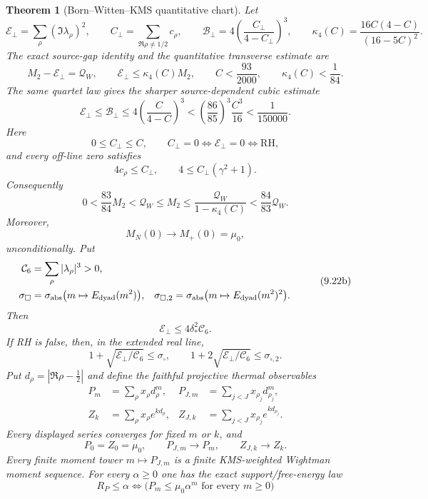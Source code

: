 \documentclass[11pt]{article}
\newtheorem{theorem}{Theorem}[section]
\begin{document}
\begin{theorem}[Born--Witten--KMS quantitative chart]
Let
\[
 \mathcal E_\perp=\sum_\rho(\Im\lambda_\rho)^2,\qquad
 C_\perp=\sum_{\Re\rho\ne1/2}c_\rho,\qquad
 \mathcal B_\perp=
 4\left(\frac{C_\perp}{4-C_\perp}\right)^3,\qquad
 \kappa_4(C)=\frac{16C(4-C)}{(16-5C)^2}.
 \tag{9.20}
\]
The exact source-gap identity and the quantitative transverse estimate are
\[
 M_2-\mathcal E_\perp=\mathcal Q_W,\qquad
 \mathcal E_\perp\le\kappa_4(C)M_2,\qquad
 C<\frac{93}{2000},\qquad \kappa_4(C)<\frac1{84}.
 \tag{9.21}
\]
The same quartet law gives the sharper source-dependent cubic estimate
\[
 \mathcal E_\perp
 \le\mathcal B_\perp
 \le4\left(\frac{C}{4-C}\right)^3
 <\left(\frac{86}{85}\right)^3\frac{C^3}{16}
 <\frac1{150000}.
 \tag{9.21a}
\]
Here
\[
 0\le C_\perp\le C,\qquad
 C_\perp=0\Longleftrightarrow\mathcal E_\perp=0
 \Longleftrightarrow\mathrm{RH},
 \tag{9.21b}
\]
and every off-line zero satisfies
\[
 4c_\rho\le C_\perp,\qquad
 4\le C_\perp(\gamma^2+1).
 \tag{9.21c}
\]
Consequently
\[
 0<\frac{83}{84}M_2<\mathcal Q_W\le M_2
 \le\frac{\mathcal Q_W}{1-\kappa_4(C)}
 <\frac{84}{83}\mathcal Q_W.
 \tag{9.22}
\]
Moreover,
\[
 M_N(0)\longrightarrow M_+(0)=\mu_0,
 \tag{9.22a}
\]
unconditionally.  Put
\[
 \begin{aligned}
 \mathcal C_6&=\sum_\rho|\lambda_\rho|^3>0,\\
 \sigma_\square&=\sigma_{\rm abs}\bigl(m\mapsto E_{\rm dyad}(m^2)\bigr),
 &\sigma_{\square,2}&=\sigma_{\rm abs}\bigl(m\mapsto E_{\rm dyad}(m^2)^2\bigr).
 \end{aligned}
 \tag{9.22b}
\]
Then
\[
 \mathcal E_\perp\le4\delta_*^2\mathcal C_6.
 \tag{9.22c}
\]
If RH is false, then, in the extended real line,
\[
 1+\sqrt{\mathcal E_\perp/\mathcal C_6}\le\sigma_\square,
 \qquad
 1+2\sqrt{\mathcal E_\perp/\mathcal C_6}\le\sigma_{\square,2}.
 \tag{9.22d}
\]
Put $d_\rho=|\Re\rho-\frac12|$ and define the faithful projective thermal observables
\[
 \begin{aligned}
 P_m&=\sum_\rho x_\rho d_\rho^m,&
 P_{J,m}&=\sum_{j<J}x_{\rho_j}d_{\rho_j}^m,\\
 Z_k&=\sum_\rho x_\rho e^{k d_\rho},&
 Z_{J,k}&=\sum_{j<J}x_{\rho_j}e^{k d_{\rho_j}}.
 \end{aligned}
 \tag{9.22e}
\]
Every displayed series converges for fixed $m$ or $k$, and
\[
 P_0=Z_0=\mu_0,\qquad
 P_{J,m}\longrightarrow P_m,\qquad
 Z_{J,k}\longrightarrow Z_k.
 \tag{9.22f}
\]
Every finite moment tower $m\mapsto P_{J,m}$ is a finite KMS-weighted Wightman moment
sequence.  For every $\alpha\ge0$ one has the exact support/free-energy law
\[
 R_P\le\alpha
 \Longleftrightarrow
 \bigl(P_m\le\mu_0\alpha^m\text{ for every }m\ge0\bigr)
\]
\end{theorem}
\end{document}
